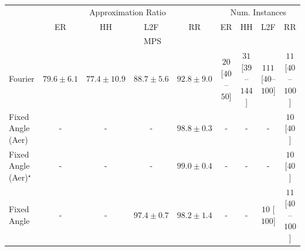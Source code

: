\begin{tabular}{l|cccc|cccc|}
\toprule
& \multicolumn{4}{c|}{Approximation Ratio} & \multicolumn{4}{c|}{Num. Instances} \\
            & ER & HH & L2F & RR & ER & HH & L2F & RR \\
\midrule
\multicolumn{9}{c}{\rule{0pt}{8pt}MPS} \\
\midrule
Fourier & {\cellcolor[HTML]{FFF8C4}} \color[HTML]{000000} $79.6\pm 6.1$ & {\cellcolor[HTML]{FFFFE5}} \color[HTML]{000000} $77.4\pm 10.9$ & {\cellcolor[HTML]{FB9225}} \color[HTML]{000000} $88.7\pm 5.6$ & {\cellcolor[HTML]{D55607}} \color[HTML]{F1F1F1} $92.8\pm 9.0$ & {\cellcolor[HTML]{FFF4F0}} \color[HTML]{000000} $20$ [$40$--$50$] & {\cellcolor[HTML]{FEF1ED}} \color[HTML]{000000} $31$ [$39$--$144$] & {\cellcolor[HTML]{FDDAD7}} \color[HTML]{000000} $111$ [$40$--$100$] & {\cellcolor[HTML]{FFF7F3}} \color[HTML]{000000} $11$ [$40$--$100$] \\
Fixed Angle (Aer) & {\cellcolor[HTML]{000000}} \color[HTML]{F1F1F1} {\cellcolor{white}} \color{black} - & {\cellcolor[HTML]{000000}} \color[HTML]{F1F1F1} {\cellcolor{white}} \color{black} - & {\cellcolor[HTML]{000000}} \color[HTML]{F1F1F1} {\cellcolor{white}} \color{black} - & {\cellcolor[HTML]{692606}} \color[HTML]{F1F1F1} $98.8\pm 0.3$ & {\cellcolor[HTML]{000000}} \color[HTML]{F1F1F1} {\cellcolor{white}} \color{black} - & {\cellcolor[HTML]{000000}} \color[HTML]{F1F1F1} {\cellcolor{white}} \color{black} - & {\cellcolor[HTML]{000000}} \color[HTML]{F1F1F1} {\cellcolor{white}} \color{black} - & {\cellcolor[HTML]{FFF7F3}} \color[HTML]{000000} $10$ [$40$] \\
Fixed Angle (Aer)$^\star$ & {\cellcolor[HTML]{000000}} \color[HTML]{F1F1F1} {\cellcolor{white}} \color{black} - & {\cellcolor[HTML]{000000}} \color[HTML]{F1F1F1} {\cellcolor{white}} \color{black} - & {\cellcolor[HTML]{000000}} \color[HTML]{F1F1F1} {\cellcolor{white}} \color{black} - & {\cellcolor[HTML]{662506}} \color[HTML]{F1F1F1} $99.0\pm 0.4$ & {\cellcolor[HTML]{000000}} \color[HTML]{F1F1F1} {\cellcolor{white}} \color{black} - & {\cellcolor[HTML]{000000}} \color[HTML]{F1F1F1} {\cellcolor{white}} \color{black} - & {\cellcolor[HTML]{000000}} \color[HTML]{F1F1F1} {\cellcolor{white}} \color{black} - & {\cellcolor[HTML]{FFF7F3}} \color[HTML]{000000} $10$ [$40$] \\
Fixed Angle & {\cellcolor[HTML]{000000}} \color[HTML]{F1F1F1} {\cellcolor{white}} \color{black} - & {\cellcolor[HTML]{000000}} \color[HTML]{F1F1F1} {\cellcolor{white}} \color{black} - & {\cellcolor[HTML]{832D05}} \color[HTML]{F1F1F1} $97.4\pm 0.7$ & {\cellcolor[HTML]{742905}} \color[HTML]{F1F1F1} $98.2\pm 1.4$ & {\cellcolor[HTML]{000000}} \color[HTML]{F1F1F1} {\cellcolor{white}} \color{black} - & {\cellcolor[HTML]{000000}} \color[HTML]{F1F1F1} {\cellcolor{white}} \color{black} - & {\cellcolor[HTML]{FFF7F3}} \color[HTML]{000000} $10$ [$100$] & {\cellcolor[HTML]{FFF7F3}} \color[HTML]{000000} $11$ [$40$--$100$] \\

\end{tabular}
